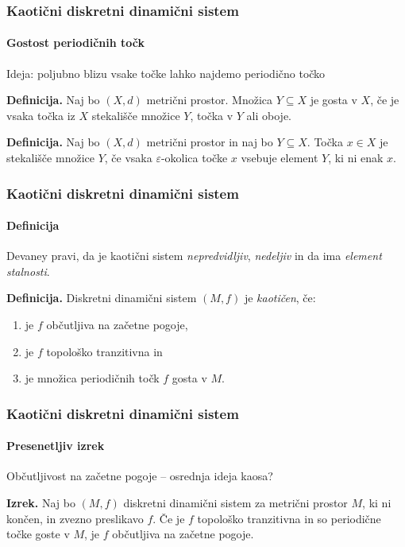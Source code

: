 \documentclass[12pt]{beamer}
\begin{document}
\begin{frame}
\frametitle{Kaotični diskretni dinamični sistem}
\framesubtitle{Gostost periodičnih točk}
Ideja: poljubno blizu vsake točke lahko najdemo periodično točko

\bigskip

\medskip

\textbf{Definicija.}
Naj bo $(X,d)$ metrični prostor. Množica $Y \subseteq X$ je gosta v $X$, če je vsaka točka iz $X$ stekališče množice $Y$, točka v $Y$ ali oboje.

\medskip

\textbf{Definicija.}
Naj bo $(X,d)$ metrični prostor in naj bo $Y \subseteq X$. Točka $x \in X$ je stekališče množice $Y$, če vsaka $\varepsilon$-okolica točke $x$ vsebuje element $Y$, ki ni enak $x$.

\end{frame}


\begin{frame}
\frametitle{Kaotični diskretni dinamični sistem}
\framesubtitle{Definicija}

Devaney pravi, da je kaotični sistem \emph{nepredvidljiv}, \emph{nedeljiv} in da ima \emph{element stalnosti}.

\bigskip

\textbf{Definicija.}
Diskretni dinamični sistem $(M,f)$ je \emph{kaotičen}, če:
\begin{enumerate}
    \item je $f$ občutljiva na začetne pogoje,
    \item je $f$ topološko tranzitivna in
    \item je množica periodičnih točk $f$ gosta v $M$.
\end{enumerate}

\end{frame}


\begin{frame}
\frametitle{Kaotični diskretni dinamični sistem}
\framesubtitle{Presenetljiv izrek}

Občutljivost na začetne pogoje -- osrednja ideja kaosa?

\bigskip

\textbf{Izrek.}
Naj bo $(M, f)$ diskretni dinamični sistem za metrični prostor $M$, ki ni končen, in zvezno preslikavo $f$. Če je $f$ topološko tranzitivna in so periodične točke goste v $M$, je $f$ občutljiva na začetne pogoje.

\end{frame}
\end{document}
